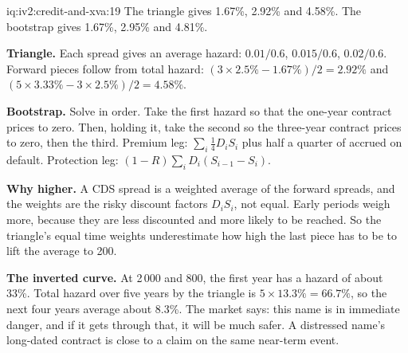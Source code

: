 \begin{solution}{iq:iv2:credit-and-xva:19}
The triangle gives 1.67\%, 2.92\% and 4.58\%. The bootstrap gives 1.67\%, 2.95\% and 4.81\%.

\textbf{Triangle.} Each spread gives an average hazard: $0.01/0.6$, $0.015/0.6$, $0.02/0.6$. Forward pieces follow from total hazard: $(3 \times 2.5\% - 1.67\%)/2 = 2.92\%$ and $(5 \times 3.33\% - 3 \times 2.5\%)/2 = 4.58\%$.

\textbf{Bootstrap.} Solve in order. Take the first hazard so that the one-year contract prices to zero. Then, holding it, take the second so the three-year contract prices to zero, then the third. Premium leg: $\sum_i \tfrac14 D_i S_i$ plus half a quarter of accrued on default. Protection leg: $(1 - R)\sum_i D_i (S_{i-1} - S_i)$.

\textbf{Why higher.} A CDS spread is a weighted average of the forward spreads, and the weights are the risky discount factors $D_iS_i$, not equal. Early periods weigh more, because they are less discounted and more likely to be reached. So the triangle's equal time weights underestimate how high the last piece has to be to lift the average to 200.

\textbf{The inverted curve.} At 2\,000 and 800, the first year has a hazard of about 33\%. Total hazard over five years by the triangle is $5 \times 13.3\% = 66.7\%$, so the next four years average about 8.3\%. The market says: this name is in immediate danger, and if it gets through that, it will be much safer. A distressed name's long-dated contract is close to a claim on the same near-term event.

\end{solution}

